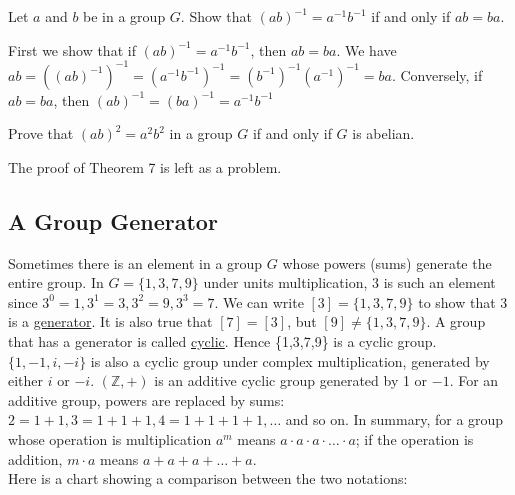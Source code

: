 \documentclass[12pt]{book}
\theoremstyle{definition}
\def\Z{\mathbb{Z}}
\begin{document}
%
\begin{tctheorem}{}{}
	Let $a$ and $b$ be in a group $G$. Show that $(ab)^{-1} = a^{-1}b^{-1}$ if and only if $ab=ba$.
\end{tctheorem}
\begin{newproof}
First we show that if $ (ab)^{-1}=a^{-1}b^{-1} $, then $ ab=ba $. We have $ ab=((ab)^{-1})^{-1}=(a^{-1}b^{-1})^{-1}=(b^{-1})^{-1}(a^{-1})^{-1}=ba $. Conversely, if $ ab=ba $, then $ (ab)^{-1}=(ba)^{-1}=a^{-1}b^{-1} $
\end{newproof}
%
\begin{tctheorem}{}{}
	Prove that $(ab)^2=a^2b^2$ in a group $G$ if and only if $G$ is abelian.
\end{tctheorem}
The proof of Theorem 7 is left as a problem. 

\subsection{A Group Generator}
Sometimes there is an element in a group $G$ whose powers (sums) generate the entire group.  In $G=\{1,3,7,9\}$ under units multiplication, 3 is such an element since $3^0=1, 3^1=3, 3^2=9, 3^3=7$.  We can write $[3]=\{1,3,7,9\}$ to show that 3 is a \underline{generator}.  It is also true that $[7]=[3]$, but $[9]\neq\{1,3,7,9\}$.  A group that has a generator is called \underline{cyclic}.  Hence \{1,3,7,9\} is a cyclic group. $\{1,-1,i,-i\}$ is also a cyclic group under complex multiplication, generated by either $i$ or $-i$.  $(\Z,+)$ is an additive cyclic group generated by 1 or $-1$.  For an additive group, powers are replaced by sums: $2=1+1, 3=1+1+1, 4=1+1+1+1, \dots$ and so on.  In summary, for a group whose operation is multiplication $a^m$ means $a\cdot a \cdot a\cdot\dots\cdot a$; if the operation is addition, $m\cdot a$ means $a+a+a+\dots+a$.\\
Here is a chart showing a comparison between the two notations:\\
\end{document}
